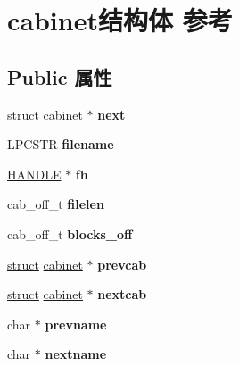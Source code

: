\hypertarget{structcabinet}{}\section{cabinet结构体 参考}
\label{structcabinet}
\subsection*{Public 属性}
\begin{DoxyCompactItemize}
\item 
\mbox{\label{structcabinet_af455389799c3c7ed45a867bb208df7bf}} 
\hyperlink{interfacestruct}{struct} \hyperlink{structcabinet}{cabinet} $\ast$ {\bfseries next}
\item 
\mbox{\label{structcabinet_af401ce135538f7da8842e9adeccc7976}} 
L\+P\+C\+S\+TR {\bfseries filename}
\item 
\mbox{\label{structcabinet_a563b1ebedb48352c6731df2f09656e9e}} 
\hyperlink{interfacevoid}{H\+A\+N\+D\+LE} $\ast$ {\bfseries fh}
\item 
\mbox{\label{structcabinet_a5ecd96105fcdbd8a29f90787aa2c5a7c}} 
cab\+\_\+off\+\_\+t {\bfseries filelen}
\item 
\mbox{\label{structcabinet_a1be4c09e91535abdc6108498af5d86da}} 
cab\+\_\+off\+\_\+t {\bfseries blocks\+\_\+off}
\item 
\mbox{\label{structcabinet_af5e4896756457faab3cd8a77637e28ae}} 
\hyperlink{interfacestruct}{struct} \hyperlink{structcabinet}{cabinet} $\ast$ {\bfseries prevcab}
\item 
\mbox{\label{structcabinet_a109d6d4e7cd02917fd95520033297229}} 
\hyperlink{interfacestruct}{struct} \hyperlink{structcabinet}{cabinet} $\ast$ {\bfseries nextcab}
\item 
\mbox{\label{structcabinet_ab5dd3b616d1de41c8ca20324fb33b05d}} 
char $\ast$ {\bfseries prevname}
\item 
\mbox{\label{structcabinet_a5e17522d1d96adbc4b9eba80eae4dc3d}} 
char $\ast$ {\bfseries nextname}

\end{DoxyCompactItemize}
